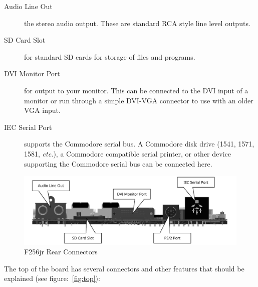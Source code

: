 \documentclass[oneside]{book}
\begin{document}
\begin{description}
    \item[Audio Line Out] the stereo audio output. These are standard RCA style line level outputs.

    \item[SD Card Slot] for standard SD cards for storage of files and programs.

    \item[DVI Monitor Port] for output to your monitor. This can be connected to the DVI input of a monitor or run through a simple DVI-VGA connector to use with an older VGA input.

    \item[IEC Serial Port] supports the Commodore serial bus. A Commodore disk drive (1541, 1571, 1581, {\it etc.}), a Commodore compatible serial printer, or other device supporting the Commodore serial bus can be connected here.
\end{description}

\begin{figure}[ht]
    \begin{center}
        \includegraphics[scale=0.75]{images/f256_render_annotated_back.pdf}
    \end{center}
    \caption{F256jr Rear Connectors}
    \label{fig:rear}
\end{figure}

The top of the board has several connectors and other features that should be explained (see figure:~\ref{fig:top}):
\end{document}
